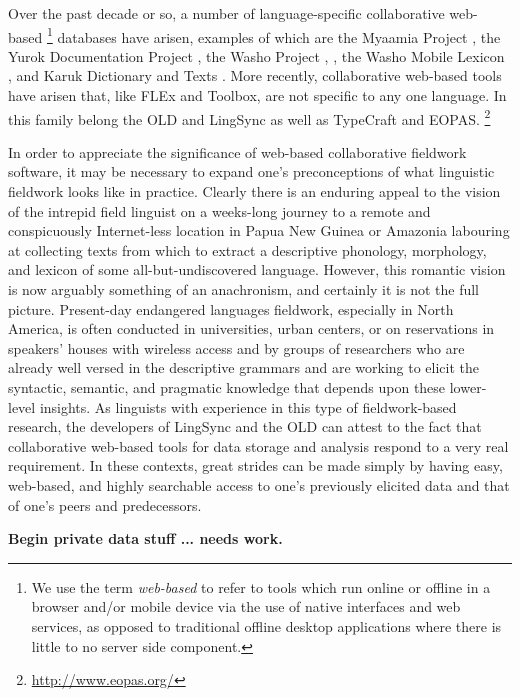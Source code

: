 \documentclass[11pt]{article}
\begin{document}
Over the past decade or so, a number of language-specific collaborative web-based%
\footnote{We use the term \emph{web-based} to refer to tools which run online
or offline in a browser and/or mobile device via the use of native interfaces
and web services, as opposed to traditional offline desktop applications where
there is little to no server side component.} %
databases have arisen, examples of which are the Myaamia Project
\cite{Myaamia:2001}, the Yurok Documentation Project \cite{Yurok:2001:Online},
the Washo Project \cite{Washo:2005:Online}, \cite{Cihlar:2008}, the Washo
Mobile Lexicon \cite{WashoMobile:2008:Online}, and Karuk Dictionary and Texts
\cite{Karuk:2009:Online}. More recently, collaborative web-based
tools have arisen that, like FLEx and Toolbox, are not specific to any one language.
In this family belong the OLD \cite{dunham2014} and LingSync \cite{lingsync:2012}
as well as TypeCraft \cite{farrar10} and EOPAS.%
\footnote{\url{http://www.eopas.org/}} %

In order to appreciate the significance of web-based collaborative fieldwork
software, it may be necessary to expand one's preconceptions of what linguistic
fieldwork looks like in practice. Clearly there is an enduring appeal
to the vision of the intrepid field linguist on a weeks-long journey to a
remote and conspicuously Internet-less location in Papua New Guinea or Amazonia
labouring at collecting texts from which to extract a descriptive phonology,
morphology, and lexicon of some all-but-undiscovered language. However, this
romantic vision is now arguably something of an anachronism, and certainly it
is not the full picture. Present-day endangered languages fieldwork, especially
in North America, is often conducted in universities, urban centers, or on
reservations in speakers' houses with wireless access and by groups of
researchers who are already well versed in the descriptive grammars and are
working to elicit the syntactic, semantic, and pragmatic knowledge that depends
upon these lower-level insights. As linguists with experience in this type of
fieldwork-based research, the developers of LingSync and the OLD can attest to
the fact that collaborative web-based tools for data storage and analysis respond
to a very real requirement. In these contexts, great strides can be made simply
by having easy, web-based, and highly searchable access to one's previously
elicited data and that of one's peers and predecessors.




\textbf{Begin private data stuff ... needs work.}
\end{document}
